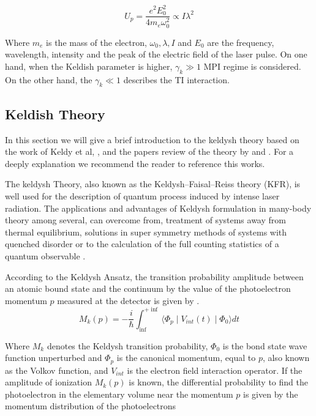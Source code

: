 \begin{equation}
U_{p} = \dfrac{e^{2}E_{0}^{2}}{4m_{e}\omega_{0}^{2}} \propto I \lambda^{2}
\end{equation}

Where $m_{e}$ is the mass of the electron, $\omega_{0}, \lambda, I$ and $E_{0}$ are the frequency, wavelength, intensity and the peak of the electric field of the laser pulse. On one hand, when the Keldish parameter is higher, $\gamma_{k} \gg 1$ MPI regime is considered. On the other hand, the $\gamma_{k} \ll 1$ describes the TI interaction.

\subsection{ Keldish Theory}

In this section we will give a brief introduction to the keldysh theory based on the work of Keldy et al, \cite{keldysh_ionization_1965}, and the papers review of the theory by \cite{popruzhenko_keldysh_2014} and \cite{karnakov_strong_2009}. For a deeply explanation we recommend the reader to reference this works.

The keldysh Theory, also known as the Keldysh–Faisal–Reiss theory (KFR), is well used for the description of quantum process induced by intense laser radiation. The applications and advantages of Keldysh formulation in many-body theory among  several, can overcome from, treatment of systems away from thermal equilibrium, solutions in  super symmetry methods of systems with quenched disorder or to the  calculation of the full counting statistics of a quantum observable \cite{kamenev_introduction_nodate}.

According to the Keldysh Ansatz, the transition probability amplitude between an atomic bound state and the continuum by the value of the photoelectron momentum $p$ measured at the detector is given by \cite{popruzhenko_keldysh_2014}.
 \begin{equation}
 M_{k}(p) = -\dfrac{i}{\hbar} \int_{\inf}^{+\inf} \langle \Phi_{p}\mid  V_{int}(t)\mid \Phi_{0} \rangle dt
 \end{equation}

Where $M_{k}$ denotes the Keldysh transition probability, $\Phi_{0}$ is the bond state wave function unperturbed and $\Phi_{p}$ is the canonical momentum, equal to $p$, also known as the Volkov function, and $V_{int}$ is the electron field interaction operator. If the amplitude of ionization $M_{k}(p)$ is known, the differential probability to find the photoelectron in the elementary volume near the momentum $p$ is given by the momentum distribution of the photoelectrons 

